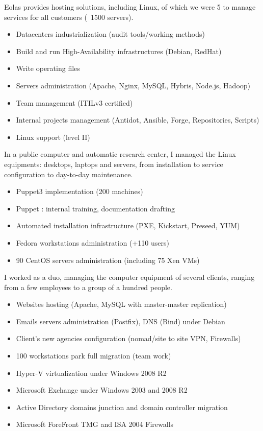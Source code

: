 \documentclass[12pt,a4paper,roman]{moderncv}          %
\begin{document}
{Eolas provides hosting solutions, including Linux, of which we were 5 to manage services for all customers (~1500 servers).
\begin{itemize}
  \item Datacenters industrialization (audit tools/working methods)
  \item Build and run High-Availability infrastructures (Debian, RedHat)
  \item Write operating files
  \item Servers administration (Apache, Nginx, MySQL, Hybris, Node.js, Hadoop)
  \item Team management (ITILv3 certified)
  \item Internal projects management (Antidot, Ansible, Forge, Repositories, Scripts)
  \item Linux support (level II)
\end{itemize}}

{In a public computer and automatic research center, I managed the Linux equipments: desktops, laptops and servers, from installation to service configuration to day-to-day maintenance.
\begin{itemize}
  \item Puppet3 implementation (200 machines)
  \item Puppet : internal training, documentation drafting
  \item Automated installation infrastructure (PXE, Kickstart, Preseed, YUM)
  \item Fedora workstations administration (+110 users)
  \item 90 CentOS servers administration (including 75 Xen VMs)
\end{itemize}}

{I worked as a duo, managing the computer equipment of several clients, ranging from a few employees to a group of a hundred people.
\begin{itemize}
  \item Websites hosting (Apache, MySQL with master-master replication)
  \item Emails servers administration (Postfix), DNS (Bind) under Debian
  \item Client's new agencies configuration (nomad/site to site VPN, Firewalls)
  \item 100 workstations park full migration (team work)
  \item Hyper-V virtualization under Windows 2008 R2
  \item Microsoft Exchange under Windows 2003 and 2008 R2
  \item Active Directory domains junction and domain controller migration
  \item Microsoft ForeFront TMG and ISA 2004 Firewalls
\end{itemize}}
\end{document}

